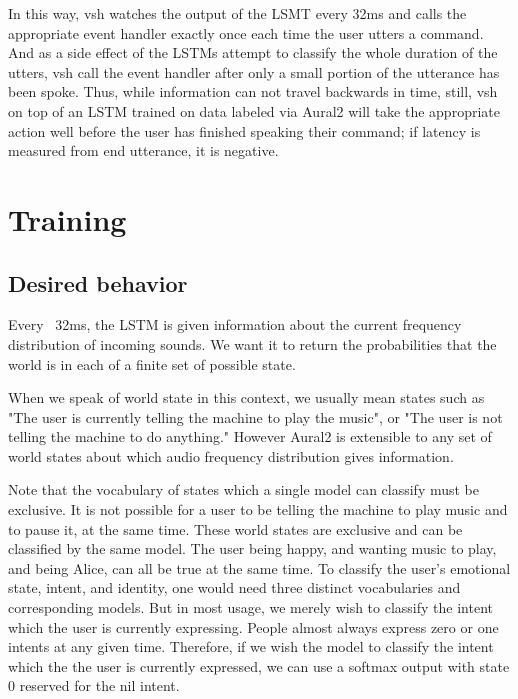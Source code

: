 \documentclass[conference]{IEEEtran}
\begin{document}
In this way, vsh watches the output of the LSMT every 32ms and calls the appropriate event handler exactly once each time the user utters a command.
And as a side effect of the LSTMs attempt to classify the whole duration of the utters, vsh call the event handler after only a small portion of the utterance has been spoke.
Thus, while information can not travel backwards in time, still,
vsh on top of an LSTM trained on data labeled via Aural2 will take the appropriate action well before the user has finished speaking their command;
if latency is measured from end utterance, it is negative.

\section{Training}
\subsection{Desired behavior}
Every ~32ms, the LSTM is given information about the current frequency distribution of incoming sounds.
We want it to return the probabilities that the world is in each of a finite set of possible state.

When we speak of world state in this context, we usually mean states such as "The user is currently telling the machine to play the music", or "The user is not telling the machine to do anything."
However Aural2 is extensible to any set of world states about which audio frequency distribution gives information.

Note that the vocabulary of states which a single model can classify must be exclusive.
It is not possible for a user to be telling the machine to play music and to pause it, at the same time.
These world states are exclusive and can be classified by the same model.
The user being happy, and wanting music to play, and being Alice, can all be true at the same time.
To classify the user's emotional state, intent, and identity, one would need three distinct vocabularies and corresponding models.
But in most usage, we merely wish to classify the intent which the user is currently expressing.
People almost always express zero or one intents at any given time.
Therefore, if we wish the model to classify the intent which the the user is currently expressed, we can use a softmax output with state 0 reserved for the nil intent.
\end{document}
